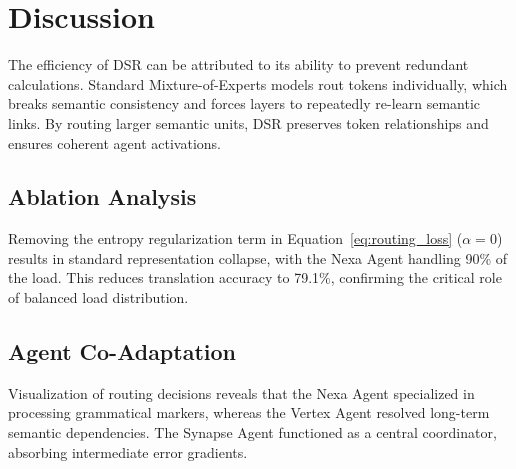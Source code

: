 \section{Discussion}
\label{sec:discussion}
The efficiency of DSR can be attributed to its ability to prevent redundant calculations. Standard Mixture-of-Experts models rout tokens individually, which breaks semantic consistency and forces layers to repeatedly re-learn semantic links. By routing larger semantic units, DSR preserves token relationships and ensures coherent agent activations.

\subsection{Ablation Analysis}
Removing the entropy regularization term in Equation~\eqref{eq:routing_loss} ($\alpha = 0$) results in standard representation collapse, with the Nexa Agent handling 90\% of the load. This reduces translation accuracy to 79.1\%, confirming the critical role of balanced load distribution.

\subsection{Agent Co-Adaptation}
Visualization of routing decisions reveals that the Nexa Agent specialized in processing grammatical markers, whereas the Vertex Agent resolved long-term semantic dependencies. The Synapse Agent functioned as a central coordinator, absorbing intermediate error gradients.
